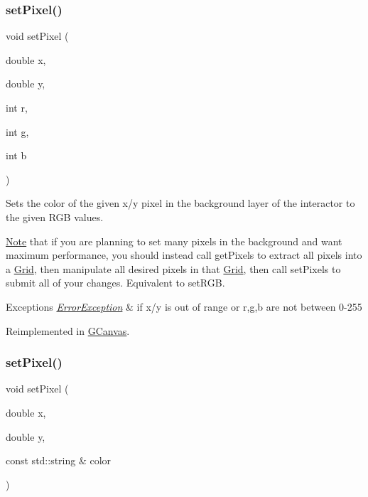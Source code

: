 \subsubsection{\texorpdfstring{set\+Pixel()}{setPixel()}\hspace{0.1cm}{\footnotesize\ttfamily [2/3]}}
{\footnotesize\ttfamily void set\+Pixel (\begin{DoxyParamCaption}\item[{double}]{x,  }\item[{double}]{y,  }\item[{int}]{r,  }\item[{int}]{g,  }\item[{int}]{b }\end{DoxyParamCaption})\hspace{0.3cm}{\ttfamily [virtual]}}



Sets the color of the given x/y pixel in the background layer of the interactor to the given R\+GB values. 

\mbox{\hyperlink{classNote}{Note}} that if you are planning to set many pixels in the background and want maximum performance, you should instead call get\+Pixels to extract all pixels into a \mbox{\hyperlink{classGrid}{Grid}}, then manipulate all desired pixels in that \mbox{\hyperlink{classGrid}{Grid}}, then call set\+Pixels to submit all of your changes. Equivalent to set\+R\+GB.


\begin{DoxyExceptions}{Exceptions}
{\em \mbox{\hyperlink{classErrorException}{Error\+Exception}}} & if x/y is out of range or r,g,b are not between 0-\/255 \\
\hline
\end{DoxyExceptions}


Reimplemented in \mbox{\hyperlink{classGCanvas_af9aca140f86a6de6a4368d41349dd57c}{G\+Canvas}}.

\mbox{\label{classGDrawingSurface_a09f9640e4ff7388dcfc391efd88d2415}} 
\subsubsection{\texorpdfstring{set\+Pixel()}{setPixel()}\hspace{0.1cm}{\footnotesize\ttfamily [3/3]}}
{\footnotesize\ttfamily void set\+Pixel (\begin{DoxyParamCaption}\item[{double}]{x,  }\item[{double}]{y,  }\item[{const std\+::string \&}]{color }\end{DoxyParamCaption})\hspace{0.3cm}{\ttfamily [virtual]}}



